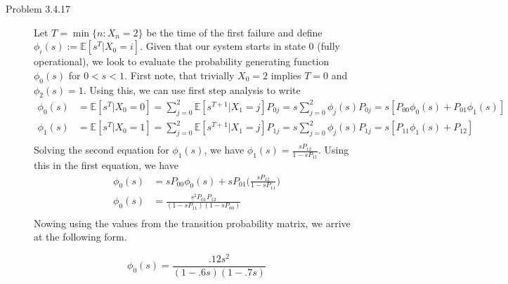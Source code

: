 \documentclass[12pt]{article}  %
\newcommand{\E}{{\mathbb{E}}}
\begin{document}
\begin{description}
\item[Problem 3.4.17] Let $T = \min\{n:X_n = 2\}$ be the time of the first failure and define $\phi_i(s) :=\E[s^T|X_0 = i]$. Given that our system starts in state $0$ (fully operational), we look to evaluate the probability generating function $\phi_0(s)$ for $0<s<1$. First note, that trivially $X_0 = 2$ implies $T = 0$ and $\phi_2(s) = 1$. Using this, we can use first step analysis to write 
\begin{align*}
\phi_0(s) &= \E[s^T|X_0 = 0] = \sum_{j=0}^{2}\E[s^{T+1}|X_1 = j]P_{0j} = s\sum_{j=0}^{2}\phi_j(s)P_{0j} = s\left[P_{00}\phi_0(s) + P_{01}\phi_1(s)\right]\\
\phi_1(s) &= \E[s^T|X_0 = 1] = \sum_{j=0}^{2}\E[s^{T+1}|X_1 = j]P_{1j} = s\sum_{j=0}^{2}\phi_j(s)P_{1j} = s\left[P_{11}\phi_1(s) + P_{12}\right]\\
\end{align*}
Solving the second equation for $\phi_1(s)$, we have $\phi_1(s) = \frac{sP_{12}}{1-sP_{11}}$. Using this in the first equation, we have 
\begin{align*}
\phi_{0}(s) &= sP_{00}\phi_{0}(s) + sP_{01}\Big(\frac{sP_{12}}{1-sP_{11}}\Big)\\
\phi_{0}(s) &= \frac{s^2P_{01}P_{12}}{(1-sP_{11})(1-sP_{00})}\\
\end{align*}
Nowing using the values from the transition probability matrix, we arrive at the following form. 

$$\phi_{0}(s) = \frac{.12s^2}{(1 - .6s)(1 - .7s)}$$



\end{description}	
\end{document}
